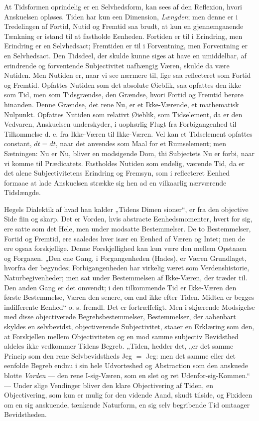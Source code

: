 \documentclass[12pt,a4paper]{book}
\begin{document}
At Tidsformen oprindelig er en Selvhedsform, kan sees af den Reflexion,
hvori Anskuelsen opløses. Tiden har kun een Dimension,
\emph{Længden}; men denne er i Tredelingen af Fortid, Nutid og Fremtid
saa brudt, at kun en gjennemgaaende Tænkning er istand til at fastholde
Eenheden. Fortiden er til i Erindring, men Erindring er en
Selvhedsact; Fremtiden er til i Forventning, men Forventning er en
Selvhedsact. Den Tidsdeel, der skulde kunne siges at have en
umiddelbar, af erindrende og forventende Subjectivitet uafhængig Væren,
skulde da være Nutiden. Men Nutiden er, naar vi see nærmere til, lige
saa reflecteret som Fortid og Fremtid. Opfattes Nutiden som det
absolute Øieblik, saa opfattes den ikke som Tid, men som Tidsgrændse,
den Grændse, hvori Fortid og Fremtid berøre hinanden. Denne Grændse,
det rene Nu, er et Ikke-Værende, et mathematisk Nulpunkt. Opfattes
Nutiden som relativt Øieblik, som Tidselement, da er den Vedvaren,
Anskuelsen underskyder, i uophørlig Flugt fra Forbigangenhed til
Tilkommelse d. e. fra Ikke-Væren til Ikke-Væren. Vel kan et
Tidselement opfattes constant, $dt = dt$, naar det anvendes som Maal
for et Rumselement; men Sætningen: Nu er Nu, bliver en modsigende Dom,
thi Subjectets Nu er forbi, naar vi komme til Prædicatets. Fastholdes
Nutiden som endelig, værende Tid, da er det alene Subjectivitetens
Erindring og Fremsyn, som i reflecteret Eenhed formaae at lade
Anskuelsen strække sig hen ad en vilkaarlig nærværende Tidslængde.

Hegels Dialektik af hvad han kalder „Tidens Dimen\-%
sioner“, er fra den objective Side fiin og skarp. Det er Vorden, hvis
abstracte Eenhedsmomenter, hvert for sig, ere satte som det Hele, men
under modsatte Bestemmelser. De to Bestemmelser, Fortid og Fremtid,
ere saaledes hver især en Eenhed af Væren og Intet; men de ere ogsaa
forskjellige. Denne Forskjellighed kan kun være den mellem Opstaaen og
Forgaaen. „Den ene Gang, i Forgangenheden (Hades), er Væren
Grundlaget, hvorfra der begyndes; Forbigangenheden har virkelig været
som Verdenshistorie, Naturbegivenheder; men sat under Bestemmelsen af
Ikke-Væren, der træder til. Den anden Gang er det omvendt; i den
tilkommende Tid er Ikke-Væren den første Bestemmelse, Væren den senere,
om end ikke efter Tiden. Midten er begges indifferente Eenhed“ o. s.
fremdl. Det er fortræffeligt. Men i skjærende Modsigelse med disse
objectiverede Begrebsbestemmelser, Bestemmelser, der aabenbart skyldes
en selvbevidst, objectiverende Subjectivitet, staaer en Erklæring som
den, at Forskjellen mellem Objectiviteten og en mod samme subjectiv
Bevidsthed aldeles ikke vedkommer Tidens Begreb. „Tiden, hedder det,
„er det samme Princip som den rene Selvbevidstheds Jeg $=$ Jeg: men
det samme eller det eenfolde Begreb endnu i sin hele Udvorteshed og
Abstraction som den anskuede blotte \emph{Vorden} --- den rene
I-sig-Væren, som en slet og ret Udenfor-sig-Kommen.“ --- Under slige
Vendinger bliver den klare Objectivering af Tiden, en Objectivering,
som kun er mulig for den vidende Aand, skudt tilside, og Fixideen om en
sig anskuende, tænkende Naturform, en sig selv begribende Tid omtaager
Bevidstheden.
\end{document}
